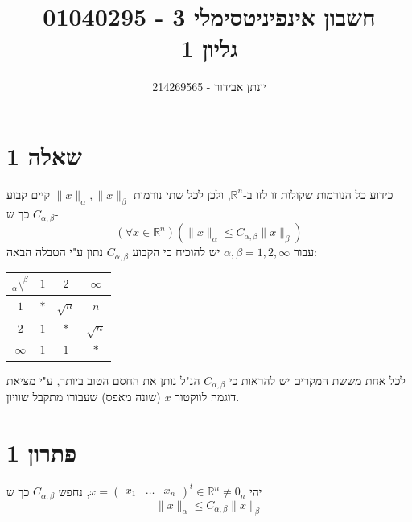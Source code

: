 \documentclass[12pt, titlepage]{article}
\title{חשבון אינפיניטסימלי 3 - 01040295 \\ גליון 1}
\author{יונתן אבידור - 214269565}
\begin{document}
\maketitle
\pagestyle{fancy}
\fancyhead{}
\part*{שאלה 1}
כידוע כל הנורמות שקולות זו לזו ב-$\mathbb{R}^n$, ולכן לכל שתי נורמות $\lVert x\rVert_\alpha, \lVert x \rVert_\beta$ קיים קבוע $C_{\alpha,\beta}$ כך ש-
\[
  \left(\forall x\in\mathbb{R}^n\right) \left(  \lVert x \rVert_\alpha \leq C_{\alpha,\beta} \lVert x\rVert_\beta\right)
\]
עבור $\alpha,\beta=1,2,\infty$ יש להוכיח כי הקבוע $C_{\alpha,\beta}$ נתון ע"י הטבלה הבאה:
  \begin{center}
    \begin{tabular}[c]{c||c|c|c|}
      $_\alpha \setminus ^\beta$ & $1$ & $2$ & $\infty$\\
      \hline
      \hline
      $1$ & $*$ & $\sqrt{n}$ & $n$ \\
      \hline
      $2$ & $1$ & $*$ & $\sqrt{n}$ \\
      \hline
      $\infty$ & $1$ & $1$ & $*$\\
      \hline
    \end{tabular}
  \end{center}

לכל אחת מששת המקרים יש להראות כי $C_{\alpha,\beta}$ הנ"ל נותן את החסם הטוב ביותר, ע"י מציאת דוגמה לווקטור $x$ (שונה מאפס) שעבורו מתקבל שוויון.
\part*{פתרון 1}
יהי $x = \begin{pmatrix}x_1&\ldots&x_n\end{pmatrix}^t\in \mathbb{R}^n \neq 0_n$, נחפש $C_{\alpha,\beta}$ כך ש
\[
  \lVert x\rVert_\alpha \leq C_{\alpha,\beta} \lVert x \rVert_\beta 
\]
\end{document}

